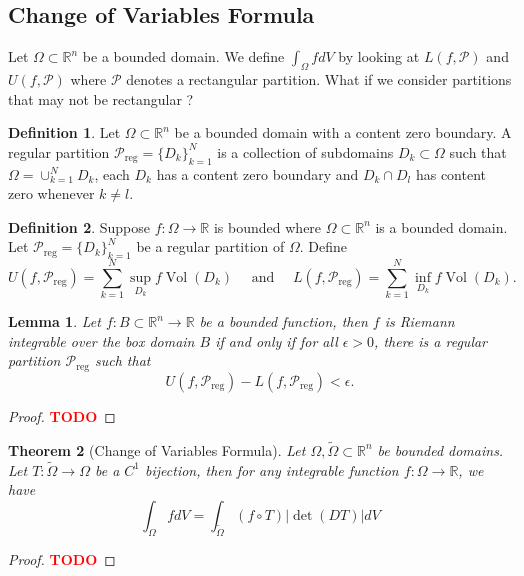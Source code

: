 \documentclass{article}
\theoremstyle{plain}
\newtheorem{theorem}{Theorem}[subsection]
\newtheorem{lemma}[theorem]{Lemma}
\theoremstyle{definition}
\newtheorem*{definition}{Definition}
\newcommand{\R}{\mathbb{R}}
\renewcommand{\P}{\mathcal{P}}
\DeclareMathOperator{\Vol}{Vol}
\newcommand{\td}{\textcolor{red}{\textbf{TODO}}}
\begin{document}
\subsection{Change of Variables Formula}

Let $\Omega \subset \R^n$ be a bounded domain. We define $\int_{\Omega}fdV$ by looking at $L(f,\P)$ and $U(f, \P)$ where $\P$ denotes a rectangular partition. What if we consider partitions that may not be rectangular ?

\begin{definition}
    Let $\Omega \subset \R^n$ be a bounded domain with a content zero boundary. A regular partition $\P_{\text{reg}} = \{D_k\}_{k=1}^N$ is a collection of subdomains $D_k \subset \Omega$ such that $\Omega = \cup_{k=1}^ND_k$, each $D_k$ has a content zero boundary and $D_k \cap D_l$ has content zero whenever $k \neq l$.
\end{definition}

\begin{definition}
    Suppose $f : \Omega \to \R$ is bounded where $\Omega \subset \R^n$ is a bounded domain. Let $\P_{\text{reg}} = \{D_k\}_{k=1}^N$ be a regular partition of $\Omega$. Define
    $$U(f, \P_{\text{reg}}) = \sum_{k=1}^{N}\sup_{D_k}f \Vol(D_k) \quad \text{ and } \quad L(f, \P_{\text{reg}}) = \sum_{k=1}^{N}\inf_{D_k}f \Vol(D_k).$$
\end{definition}

\begin{lemma}
    Let $f : B \subset \R^n \to \R$ be a bounded function, then $f$ is Riemann integrable over the box domain $B$ if and only if for all $\epsilon > 0$, there is a regular partition $\P_{\text{reg}}$ such that
    $$U(f, \P_{\text{reg}}) - L(f, \P_{\text{reg}}) < \epsilon.$$
\end{lemma}

\begin{proof}
    \td 
\end{proof}

\begin{theorem}[Change of Variables Formula]
    Let $\Omega, \tilde\Omega \subset \R^n$ be bounded domains. Let $T : \tilde\Omega \to \Omega$ be a $C^1$ bijection, then for any integrable function $f : \Omega \to \R$, we have
    $$\int_{\Omega}fdV = \int_{\tilde\Omega}(f \circ T) |\det (DT)|dV$$
\end{theorem}

\begin{proof}
    \td 
\end{proof}
\end{document}
